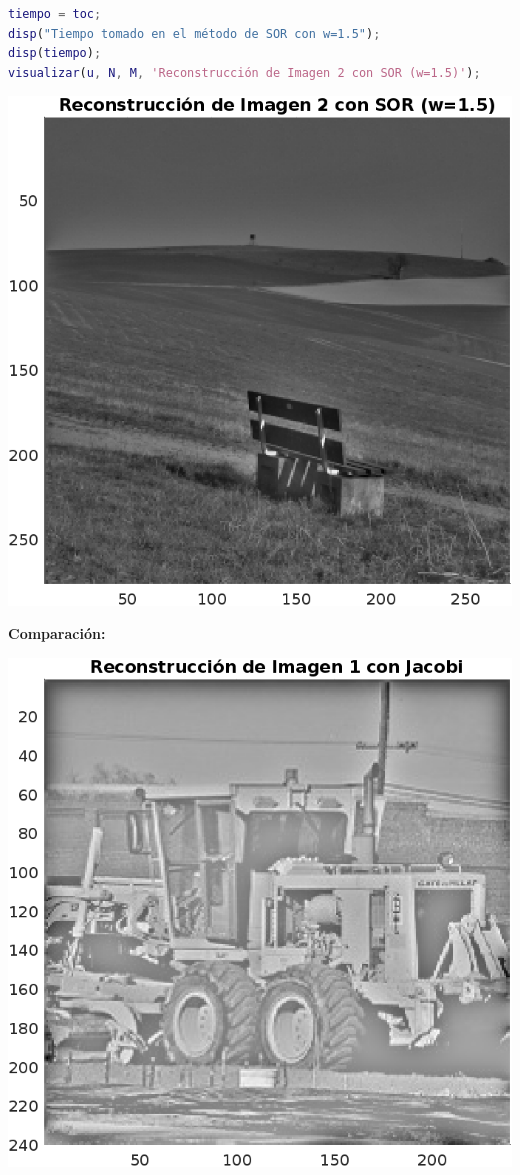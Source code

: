 \begin{homeworkProblem}
\begin{solucion}
\begin{enumerate}
\begin{lstlisting}[language = matlab]
tiempo = toc;
disp("Tiempo tomado en el método de SOR con w=1.5");
disp(tiempo);
visualizar(u, N, M, 'Reconstrucción de Imagen 2 con SOR (w=1.5)');
        \end{lstlisting}
        \begin{center}
          \includegraphics[scale=1]{Figures/Figure_2SOR.png}
        \end{center}
        \newpage
    \end{enumerate}
    \textbf{Comparación:}
    \begin{center}
      \includegraphics[scale=0.6]{Figures/Figure_1J.png}

\end{center}
\end{solucion}
\end{homeworkProblem}

